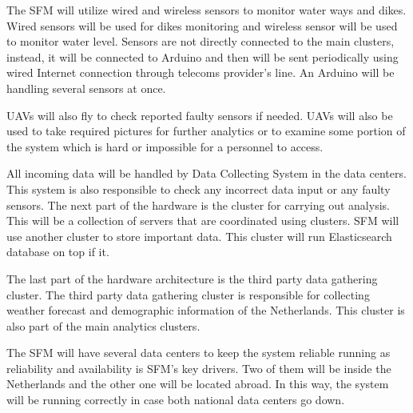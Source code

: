 
The SFM will utilize wired and wireless sensors to monitor water ways and dikes. Wired sensors will be used for dikes monitoring and wireless sensor will be used to monitor water level. Sensors are not directly connected to the main clusters, instead, it will be connected to Arduino and then will be sent periodically using wired Internet connection through telecoms provider's line. An Arduino will be handling several sensors at once.

UAVs will also fly to check reported faulty sensors if needed. UAVs will also be used to take required pictures for further analytics or to examine some portion of the system which is hard or impossible for a personnel to access.

All incoming data will be handled by Data Collecting System in the data centers. This system is also responsible to check any incorrect data input or any faulty sensors. The next part of the hardware is the cluster for carrying out analysis. This will be a collection of servers that are coordinated using clusters. SFM will use another cluster to store important data. This cluster will run Elasticsearch database on top if it.

The last part of the hardware architecture is the third party data gathering cluster. The third party data gathering cluster is responsible for collecting weather forecast and demographic information of the Netherlands. This cluster is also part of the main analytics clusters.

The SFM will have several data centers to keep the system reliable running as reliability and availability is SFM's key drivers. Two of them will be inside the Netherlands and the other one will be located abroad. In this way, the system will be running correctly in case both national data centers go down.
